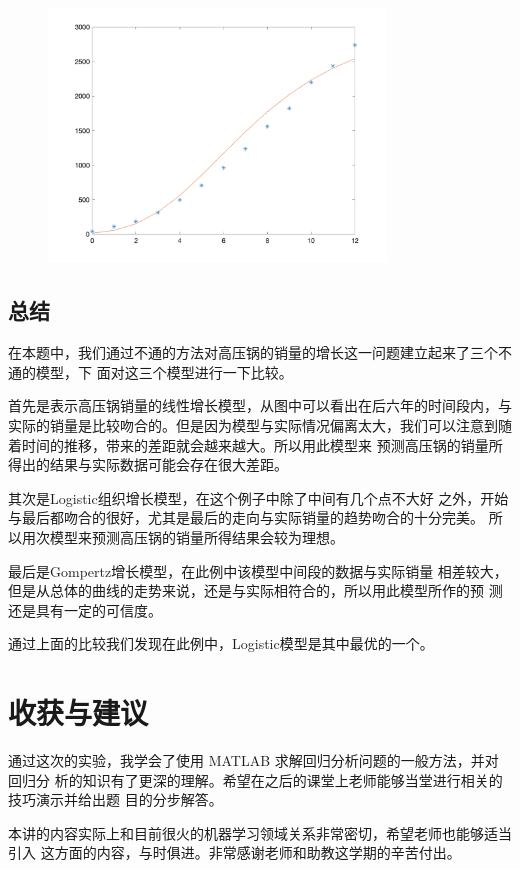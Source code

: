 \documentclass{article}
\begin{document}
\begin{figure}[H]
    \centering
    \includegraphics[width=0.8\textwidth]{pic27.png}
\end{figure}

\subsection{总结}
在本题中，我们通过不通的方法对高压锅的销量的增长这一问题建立起来了三个不通的模型，下 
面对这三个模型进行一下比较。

首先是表示高压锅销量的线性增长模型，从图中可以看出在后六年的时间段内，与实际的销量是比较吻合的。但是因为模型与实际情况偏离太大，我们可以注意到随着时间的推移，带来的差距就会越来越大。所以用此模型来 预测高压锅的销量所得出的结果与实际数据可能会存在很大差距。

其次是Logistic组织增长模型，在这个例子中除了中间有几个点不大好 
之外，开始与最后都吻合的很好，尤其是最后的走向与实际销量的趋势吻合的十分完美。 
所以用次模型来预测高压锅的销量所得结果会较为理想。

最后是Gompertz增长模型，在此例中该模型中间段的数据与实际销量 
相差较大，但是从总体的曲线的走势来说，还是与实际相符合的，所以用此模型所作的预 
测还是具有一定的可信度。

通过上面的比较我们发现在此例中，Logistic模型是其中最优的一个。

\section{收获与建议}

通过这次的实验，我学会了使用 MATLAB 求解回归分析问题的一般方法，并对回归分 析的知识有了更深的理解。希望在之后的课堂上老师能够当堂进行相关的技巧演示并给出题 目的分步解答。

本讲的内容实际上和目前很火的机器学习领域关系非常密切，希望老师也能够适当引入 这方面的内容，与时俱进。非常感谢老师和助教这学期的辛苦付出。
\end{document}
